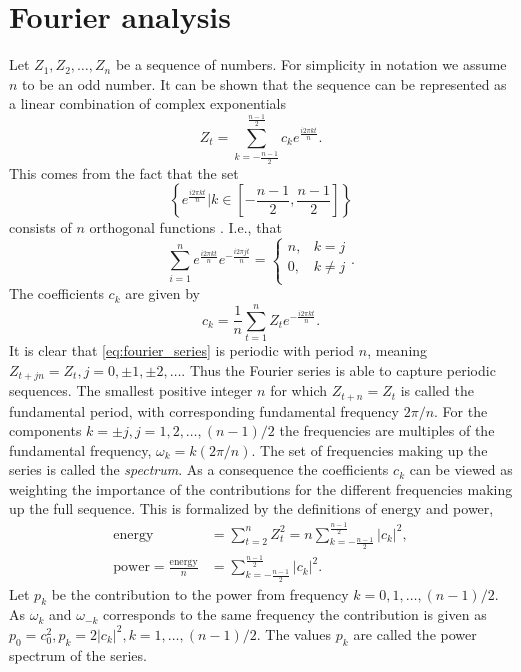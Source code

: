 \documentclass[a4paper]{memoir}
\theoremstyle{plain}
\theoremstyle{definition}
\theoremstyle{remark}
\begin{document}
\section{Fourier analysis}
Let $Z_1, Z_2, \hdots, Z_n$ be a sequence of numbers.
For simplicity in notation we assume $n$ to be an odd number.
It can be shown that the sequence can be represented as a linear combination of complex exponentials
\begin{equation}\label{eq:fourier_series}
        Z_t = \sum_{k = -\frac{n-1}{2}}^{\frac{n- 1}{2}}c_k e^{\frac{i2 \pi k t}{n}}.
\end{equation}
This comes from the fact that the set 
\begin{equation*}
        \left\{ e^{\frac{i 2 \pi kt}{n}} \Big| k \in \left[ -\frac{n -1}{2}, \frac{n - 1}{2} \right] \right\}
\end{equation*}
consists of $n$ orthogonal functions \cite{wei}.
I.e., that
\begin{equation*}
        \sum_{i = 1}^{n} e^{\frac{i2 \pi kt}{n}} e^{-\frac{i 2 \pi j t}{n}}= 
                \begin{cases}
                        n, & k = j \\
                        0, & k \neq j \\
                \end{cases}
       .
\end{equation*}
The coefficients $c_k$ are given by
\begin{equation*}
       c_k =  \frac{1}{n}\sum_{ t = 1}^{n}Z_t e^{-\frac{i 2\pi kt}{n}}.
\end{equation*}
It is clear that \eqref{eq:fourier_series} is periodic with period $n$, meaning $Z_{t + jn} = Z_t, j = 0, \pm 1, \pm 2, \hdots$.
Thus the Fourier series is able to capture periodic sequences.
The smallest positive integer $n$ for which $Z_{t + n} = Z_t$ is called the fundamental period, with corresponding fundamental frequency $2 \pi /n$.
For the components $k = \pm j, j = 1, 2, \hdots, (n-1)/2$ the frequencies are multiples of the fundamental frequency, $\omega_k = k(2\pi/n)$.
The set of frequencies making up the series is called the \textit{spectrum}.
As a consequence the coefficients $c_k$ can be viewed as weighting the importance of the contributions for the different frequencies making up the full sequence.
This is formalized by the definitions of energy and power,
\begin{align}\label{eq:energy}
        \text{energy} &= \sum_{t = 2}^{n} Z_t^2 = n \sum_{k = -\frac{n -1}{2}}^{\frac{n - 1}{2}} |c_k|^2 ,\\ 
        \label{eq:power}
        \text{power} = \frac{\text{energy}}{n} &= \sum_{k = -\frac{n -1}{2}}^{\frac{n - 1}{2}} |c_k|^2. 
\end{align}
Let $p_k$ be the contribution to the power from frequency $k = 0, 1, \hdots, (n-1)/2$.
As $\omega_k$ and $\omega_{-k}$ corresponds to the same frequency the contribution is given as $p_0 = c_0^2, p_k = 2|c_k|^2, k = 1, \hdots, (n-1)/2$.
The values $p_k$ are called the power spectrum of the series.
\end{document}
